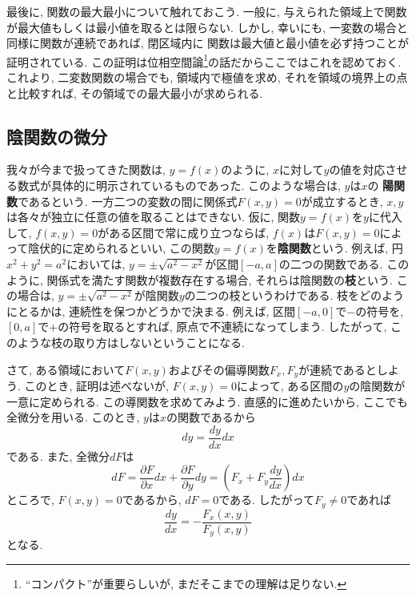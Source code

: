 \documentclass[a4j,dvipdfmx]{jsarticle}
\numberwithin{equation}{section}
\begin{document}
            最後に, 関数の最大最小について触れておこう. 一般に, 与えられた領域上で関数が最大値もしくは最小値を取るとは限らない. しかし, 幸いにも, 一変数の場合と同様に関数が連続であれば, 閉区域内に
            関数は最大値と最小値を必ず持つことが証明されている. この証明は位相空間論\footnote{``コンパクト''が重要らしいが, まだそこまでの理解は足りない.}の話だからここではこれを認めておく.
            これより, 二変数関数の場合でも, 領域内で極値を求め, それを領域の境界上の点と比較すれば, その領域での最大最小が求められる.
        \clearpage
        \subsection{陰関数の微分}
            我々が今まで扱ってきた関数は, $y=f(x)$のように, $x$に対して$y$の値を対応させる数式が具体的に明示されているものであった. このような場合は, $y$は$x$の
            \textbf{陽関数}であるという. 一方二つの変数の間に関係式$F(x,y)=0$が成立するとき, $x,y$は各々が独立に任意の値を取ることはできない.
            仮に, 関数$y=f(x)$を$y$に代入して, $f(x,y)=0$がある区間で常に成り立つならば, $f(x)$は$F(x,y)=0$によって陰伏的に定められるといい, この関数$y=f(x)$を\textbf{陰関数}という.
            例えば, 円$x^2+y^2=a^2$においては, $y=\pm\sqrt{a^2-x^2}$が区間$[-a,a]$の二つの関数である. このように, 関係式を満たす関数が複数存在する場合, それらは陰関数の\textbf{枝}という.
            この場合は, $y=\pm\sqrt{a^2-x^2}$が陰関数$y$の二つの枝というわけである. 枝をどのようにとるかは, 連続性を保つかどうかで決まる. 例えば, 区間$[-a,0]$で$-$の符号を, $[0,a]$で$+$の符号を取るとすれば, 
            原点で不連続になってしまう. したがって, このような枝の取り方はしないということになる.

            さて, ある領域において$F(x,y)$およびその偏導関数$F_x,F_y$が連続であるとしよう. このとき, 証明は述べないが, $F(x,y)=0$によって, ある区間の$y$の陰関数が一意に定められる.
            この導関数を求めてみよう. 直感的に進めたいから, ここでも全微分を用いる. このとき, $y$は$x$の関数であるから
            \begin{equation*}
                dy=\frac{dy}{dx}dx
            \end{equation*}
            である. また, 全微分$dF$は
            \begin{equation*}
                dF=\frac{\partial F}{\partial x}dx+\frac{\partial F}{\partial y}dy =\left(F_x+F_y\frac{dy}{dx}\right)dx
            \end{equation*}
            ところで, $F(x,y)=0$であるから, $dF=0$である. したがって$F_y\neq 0$であれば
            \begin{equation}
                \frac{dy}{dx}=-\frac{F_x(x,y)}{F_y(x,y)} \label{eq:偏微分:陰関数の微分F(x,y)}
            \end{equation}
            となる.
\end{document}
